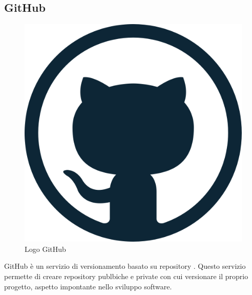 \subsection{GitHub}
\begin{figure}[H]
	\begin{center} \includegraphics[scale=0.2]{figures/github-logo}
		\caption[Logo GitHub]{Logo GitHub}  
	\end{center}
\end{figure}
GitHub è un servizio di versionamento basato su repository . Questo servizio permette di creare repository publbiche e private con cui versionare il proprio progetto, aspetto impontante nello sviluppo software.

